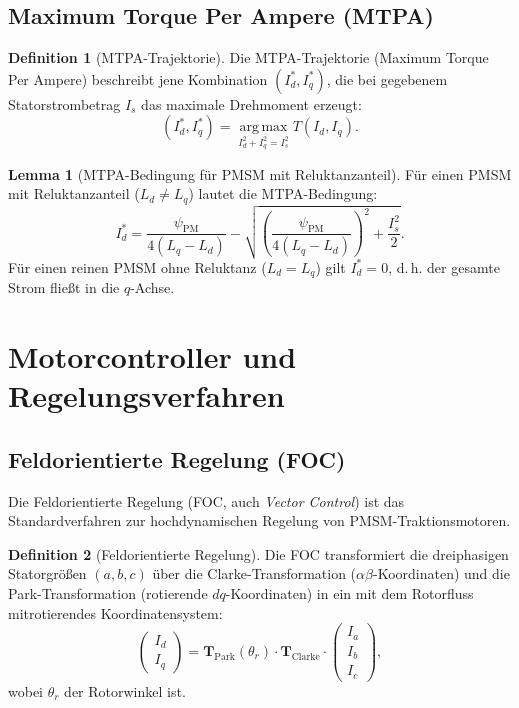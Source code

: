 ﻿\documentclass[a4paper,12pt]{article}
\theoremstyle{definition}
\newtheorem{definition}{Definition}
\newtheorem{lemma}{Lemma}
\begin{document}
\subsection{Maximum Torque Per Ampere (MTPA)}

\begin{definition}[MTPA-Trajektorie]
    Die MTPA-Trajektorie (Maximum Torque Per Ampere) beschreibt jene Kombination
    $(I_d^*, I_q^*)$, die bei gegebenem Statorstrombetrag $I_s$ das maximale
    Drehmoment erzeugt:
    \[
        (I_d^*, I_q^*) = \operatorname*{arg\,max}_{I_d^2 + I_q^2 = I_s^2} T(I_d, I_q).
    \]
\end{definition}

\begin{lemma}[MTPA-Bedingung für PMSM mit Reluktanzanteil]
    Für einen PMSM mit Reluktanzanteil ($L_d \neq L_q$) lautet die MTPA-Bedingung:
    \[
        I_d^* = \frac{\psi_{\mathrm{PM}}}{4(L_q - L_d)}
               - \sqrt{\left(\frac{\psi_{\mathrm{PM}}}{4(L_q - L_d)}\right)^2 + \frac{I_s^2}{2}}.
    \]
    Für einen reinen PMSM ohne Reluktanz ($L_d = L_q$) gilt $I_d^* = 0$, d.\,h.
    der gesamte Strom fließt in die $q$-Achse.
\end{lemma}

\section{Motorcontroller und Regelungsverfahren}
\label{sec:regelung}

\subsection{Feldorientierte Regelung (FOC)}

Die Feldorientierte Regelung (FOC, auch \emph{Vector Control}) ist das
Standardverfahren zur hochdynamischen Regelung von PMSM-Traktionsmotoren.

\begin{definition}[Feldorientierte Regelung]
    Die FOC transformiert die dreiphasigen Statorgrößen $(a, b, c)$ über die
    Clarke-Transformation ($\alpha\beta$-Koordinaten) und die Park-Transformation
    (rotierende $dq$-Koordinaten) in ein mit dem Rotorfluss mitrotierendes
    Koordinatensystem:
    \[
        \begin{pmatrix} I_d \\ I_q \end{pmatrix}
        = \mathbf{T}_{\mathrm{Park}}(\theta_r)
          \cdot \mathbf{T}_{\mathrm{Clarke}}
          \cdot \begin{pmatrix} I_a \\ I_b \\ I_c \end{pmatrix},
    \]
    wobei $\theta_r$ der Rotorwinkel ist.
\end{definition}
\end{document}
